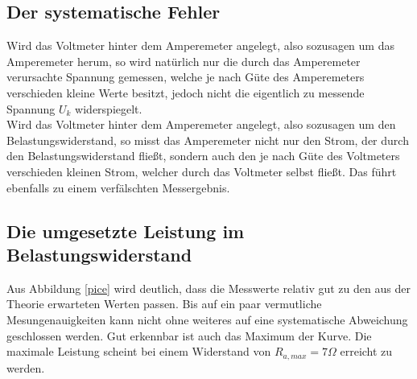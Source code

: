 \subsection{Der systematische Fehler}
Wird das Voltmeter hinter dem Amperemeter angelegt, also sozusagen um das Amperemeter
herum, so wird natürlich nur die durch das Amperemeter verursachte Spannung gemessen, welche je
nach Güte des Amperemeters verschieden kleine Werte besitzt, jedoch nicht die eigentlich
zu messende Spannung $U_k$ widerspiegelt.\\
Wird das Voltmeter hinter dem Amperemeter angelegt, also sozusagen um den Belastungswiderstand,
so misst das Amperemeter nicht nur den Strom, der durch den Belastungswiderstand fließt, sondern
auch den je nach Güte des Voltmeters verschieden kleinen Strom, welcher durch das Voltmeter selbst
fließt. Das führt ebenfalls zu einem verfälschten Messergebnis.
\subsection{Die umgesetzte Leistung im Belastungswiderstand}
Aus Abbildung \ref{pice} wird deutlich, dass die Messwerte relativ gut zu den aus der Theorie erwarteten
Werten passen. Bis auf ein paar vermutliche Mesungenauigkeiten kann nicht ohne weiteres auf eine 
systematische Abweichung geschlossen werden. Gut erkennbar ist auch das Maximum der Kurve. Die maximale Leistung scheint bei einem Widerstand von $R_{a,max}=7\Omega$ erreicht zu werden.